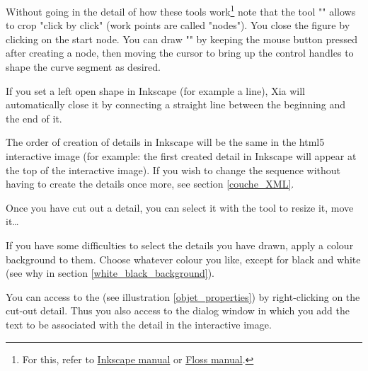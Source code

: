 Without going in the detail of how these tools work\footnote{For this, 
refer to \href{http://inkscape.org/doc/shapes/tutorial-shapes.fr.html}{Inkscape manual} or \href{http://en.flossmanuals.net/inkscape/}{Floss manual}.} note that the tool "" 
allows to crop "click by click" (work points are called 
"nodes").  You close the figure by clicking on the start node. 
You can draw "" by keeping the mouse button pressed 
after creating a node, then moving the cursor to bring up the control handles 
to shape the curve segment as desired.


\begin{alerte}
  If you set a left open shape in Inkscape (for example a line), Xia will automatically close it  by connecting a straight line between the beginning and the end of it.
\end{alerte}

\begin{alerte}
 The order of creation of details in Inkscape will be 
 the same in the html5 interactive image (for example: the first created detail in
Inkscape will appear at the top of the interactive image).
If you wish to change the sequence without having to create the details once more, see 
section \ref{couche_XML}.
\end{alerte}

Once you have cut out a detail, you can select it with the tool  
 to resize it, move it\ldots

\begin{astuce}
If you have some difficulties to select the details you have drawn,
apply a colour background to them. Choose whatever colour you like, except for black and white (see why in section \ref{white_black_background}).
\end{astuce}


You can access to the  (see illustration 
\ref{objet_properties}) by right-clicking on the cut-out detail. Thus you also access to the dialog window in which you add the text to be associated with the 
detail in the interactive image.


